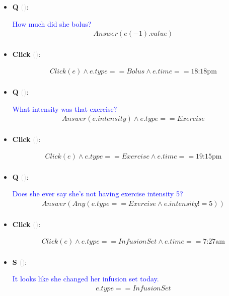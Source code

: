 \documentclass[11pt]{article}
\newcounter{CQ}
\newcounter{CS}
\newcounter{CClick}
\newcommand{\key}[1]{\textcolor{lightgray}{#1}}
\begin{document}
\begin{itemize}
	\item
	\textbf{Q\theCQ} \key{()}: \addtocounter{CQ}{1}
	\textcolor{blue}{ How much did she bolus? }
	\begin{multline*}
	Answer(e(-1).value) \\
	\end{multline*}
	
	\item
	\textbf{Click\theCClick} \key{()}: \addtocounter{CClick}{1}
	\begin{multline*}
	Click(e) \wedge e.type == Bolus \wedge e.time == \mbox{18:18pm}  \\
	\end{multline*}
	
	\item
	\textbf{Q\theCQ} \key{()}: \addtocounter{CQ}{1}
	\textcolor{blue}{ What intensity was that exercise? }
	\begin{multline*}
	Answer(e.intensity) \wedge e.type == Exercise \\
	\end{multline*}
	
	\item
	\textbf{Click\theCClick} \key{()}: \addtocounter{CClick}{1}
	\begin{multline*}
	Click(e) \wedge e.type == Exercise \wedge e.time == \mbox{19:15pm}  \\
	\end{multline*}
	
	\item
	\textbf{Q\theCQ} \key{()}: \addtocounter{CQ}{1}
	\textcolor{blue}{ Does she ever say she's not having exercise intensity 5? }
	\begin{multline*}
	Answer(Any(e.type==Exercise \wedge e.intensity != 5 )) \\
	\end{multline*}
	
	
	\item
	\textbf{Click\theCClick} \key{()}: \addtocounter{CClick}{1}
	\begin{multline*}
	Click(e) \wedge e.type == InfusionSet \wedge e.time == \mbox{7:27am}  \\
	\end{multline*}
	
	\item
	\textbf{S\theCS} \key{()}: \addtocounter{CS}{1}
	\textcolor{blue}{ It looks like she changed her infusion set today. }
	\begin{multline*}
	e.type==InfusionSet \\
	\end{multline*}
	

\end{itemize}
\end{document}
